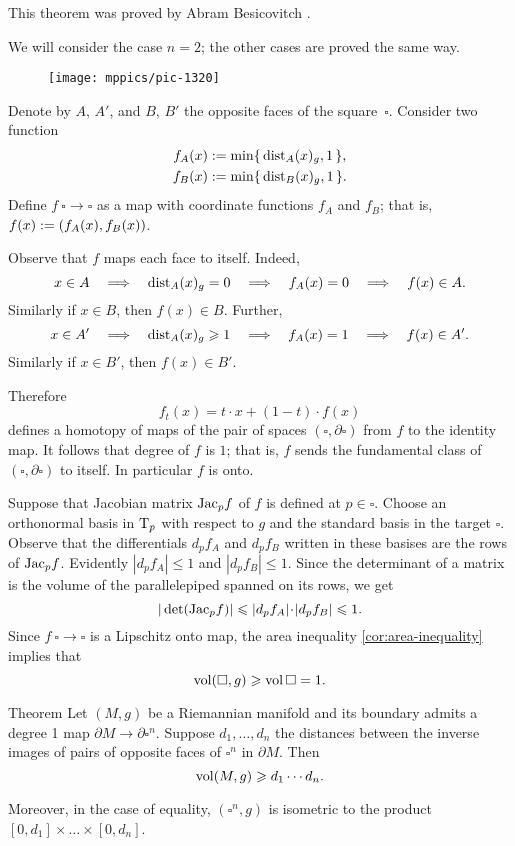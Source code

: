 This theorem was proved by Abram Besicovitch \cite{besicovitch}.

We will consider the case $n=2$; the other cases are proved the same way.

\begin{wrapfigure}{r}{30mm}
\vskip-0mm
\centering
\texttt{[image: mppics/pic-1320]}
\end{wrapfigure}

Denote by $A$, $A'$, and $B$, $B'$ the opposite faces of the square~$\square$.
Consider two function 
\begin{align*}
f_A(x)&\mathrel{:=}\min\{\,\mathrm{dist}_A(x)_g,1\,\},
\\
f_B(x)&\mathrel{:=}\min\{\,\mathrm{dist}_B(x)_g,1\,\}.
\end{align*}
Define $f\:\square\to\square$ as a map with coordinate functions $f_A$ and $f_B$;
that is, $f(x)\mathrel{:=}(f_A(x), f_B(x))$.

Observe that $f$ maps each face to itself.
Indeed, 
\[x\in A \quad\Longrightarrow\quad \mathrm{dist}_A(x)_g=0 \quad\Longrightarrow\quad f_A(x)=0 \quad\Longrightarrow\quad f(x)\in A.\]
Similarly if $x\in B$, then $f(x)\in B$.
Further, 
\[x\in A'
\quad\Longrightarrow\quad 
\mathrm{dist}_A(x)_g\geqslant 1 
\quad\Longrightarrow\quad 
f_A(x)=1 
\quad\Longrightarrow\quad 
f(x)\in A'.\]
Similarly if $x\in B'$, then $f(x)\in B'$.

Therefore 
\[f_t(x)= t\cdot x + (1-t)\cdot f(x)\]
defines a homotopy of maps of the pair of spaces $(\square,\partial \square)$ from $f$ to the identity map.
It follows that degree of $f$ is $1$; that is, $f$ sends the fundamental class of $(\square,\partial \square)$ to itself.
In particular $f$ is onto.

Suppose that Jacobian  matrix $\mathrm{Jac}_pf$ of $f$ is defined at $p\in \square$.
Choose an orthonormal basis in $\mathrm{T}_p$ with respect to $g$ and the standard basis in the target $\square$.
Observe that the differentials $d_pf_A$ and $d_pf_B$ written in these basises are the rows of $\mathrm{Jac}_pf$.
Evidently $|d_pf_A|\le 1$ and $|d_pf_B|\le 1$.
Since the determinant of a matrix is the volume of the parallelepiped spanned on its rows, we get 
\[|\det(\Jac_pf)|\le |d_pf_A|\cdot|d_pf_B|\le 1.\]
Since $f\:\square\to\square$ is a Lipschitz onto map, the {}area inequality \ref{cor:area-inequality} implies that 
\[\operatorname{\rm vol}\nolimits(\square,g)\geqslant \operatorname{\rm vol}\nolimits\square=1.\]
\qedsf


\begin{thm}{Theorem}\label{thm:besikovitch+}
Let $(M,g)$ be a Riemannian manifold and its boundary admits a degree 1 map $\partial M\to\partial\square^n$. 
Suppose $d_1,\dots, d_n$ the distances between the inverse images of pairs of opposite faces of $\square^n$ in $\partial M$.
Then 
\[\operatorname{\rm vol}\nolimits(M,g)\geqslant d_1\cdots d_n.\]

Moreover, in the case of equality, $(\square^n,g)$ is isometric to the product $[0,d_1]\times\dots\times[0,d_n]$.
\end{thm}

